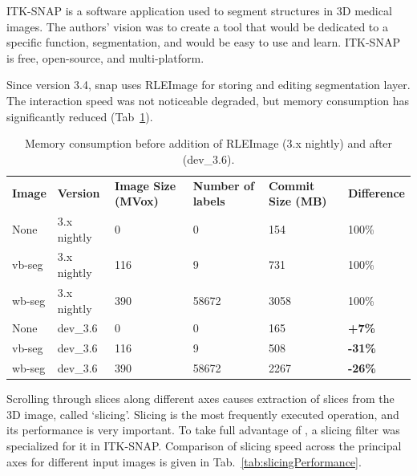 \documentclass{InsightArticle}
\begin{document}
ITK-SNAP is a software application used to segment structures in 3D medical images.
The authors' vision was to create a tool that would be dedicated to a specific function,
segmentation, and would be easy to use and learn.
ITK-SNAP is free, open-source, and multi-platform.

Since version 3.4, snap uses RLEImage for storing and editing segmentation layer.
The interaction speed was not noticeable degraded,
but memory consumption has significantly reduced (Tab~\ref{tab:memoryConsumption}).

\begin{table}[h]
	\centering
		\begin{tabular}{llllll}
		\textbf{Image} & \textbf{Version} & \textbf{Image Size (MVox)} & \textbf{Number of labels} & \textbf{Commit Size (MB)} & \textbf{Difference}            \\
		None           & 3.x nightly      & 0                          & 0                         & 154                       & 100\%                          \\
		vb-seg         & 3.x nightly      & 116                        & 9                         & 731                       & 100\%                          \\
		wb-seg         & 3.x nightly      & 390                        & 58672                     & 3058                      & 100\%                          \\
		None           & dev\_3.6         & 0                          & 0                         & 165                       & {\color{red} \textbf{+7\%}}    \\
		vb-seg         & dev\_3.6         & 116                        & 9                         & 508                       & {\color{green} \textbf{-31\%}} \\
		wb-seg         & dev\_3.6         & 390                        & 58672                     & 2267                      & {\color{green} \textbf{-26\%}}
		\end{tabular}
	\caption{Memory consumption before addition of RLEImage (3.x nightly) and after (dev\_3.6).}
	\label{tab:memoryConsumption}
\end{table}

Scrolling through slices along different axes causes
extraction of slices from the 3D image, called `slicing'.
Slicing is the most frequently executed operation, and its performance is very important.
To take full advantage of ,
a slicing filter was specialized for it in ITK-SNAP.
Comparison of slicing speed across the principal axes for different input images
is given in Tab.~\ref{tab:slicingPerformance}.
\end{document}
